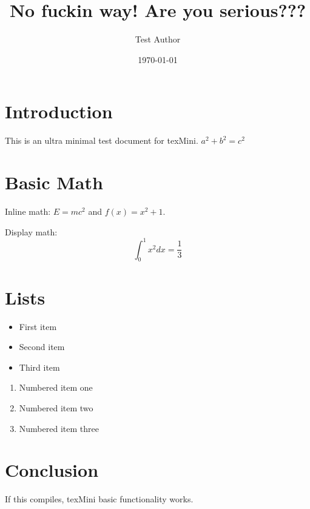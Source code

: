 \documentclass[11pt]{article}
\title{No fuckin way! Are you serious???}
\author{Test Author}
\date{\today}
\begin{document}
\maketitle

\section{Introduction}

This is an ultra minimal test document for texMini. $a^2 + b^2 = c^2$

\section{Basic Math}

Inline math: $E = mc^2$ and $f(x) = x^2 + 1$.

Display math:
\begin{equation}
    \int_0^1 x^2 dx = \frac{1}{3}
\end{equation}

\section{Lists}

\begin{itemize}
    \item First item
    \item Second item
    \item Third item
\end{itemize}

\begin{enumerate}
    \item Numbered item one
    \item Numbered item two
    \item Numbered item three
\end{enumerate}

\section{Conclusion}

If this compiles, texMini basic functionality works.
\end{document}
